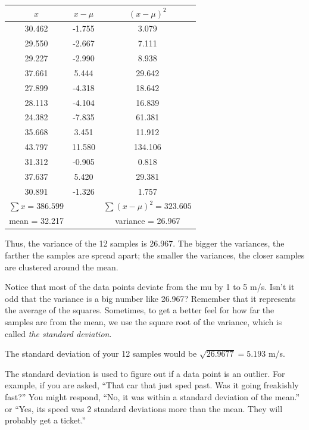 \begin{tabular} {c | c | c}

  $x$ & $x - \mu$ & $(x - \mu)^2$\\
  \hline
30.462 & -1.755 & 3.079 \\
29.550 & -2.667 & 7.111\\
29.227 & -2.990 & 8.938\\
37.661 & 5.444 & 29.642\\
27.899 & -4.318 & 18.642\\
28.113 & -4.104 & 16.839 \\
24.382 & -7.835 & 61.381 \\
35.668 & 3.451 & 11.912 \\
43.797 & 11.580 & 134.106\\
31.312 & -0.905 & 0.818\\
37.637 & 5.420 & 29.381\\
30.891 & -1.326 & 1.757\\
\hline
$\sum x = 386.599$ & & $\sum (x - \mu)^2 = 323.605$\\
mean = 32.217 & & variance = 26.967
\end{tabular}

Thus, the variance of the 12 samples is 26.967. The bigger the variances, 
the farther the samples are spread apart; the smaller the variances, the closer
samples are clustered around the mean.

Notice that most of the data points deviate from the mu by 1 to 5
m/s. Isn't it odd that the variance is a big number like 26.967?
Remember that it represents the average of the squares. Sometimes, to
get a better feel for how far the samples are from the mean, we use
the square root of the variance, which is called \textit{the standard
  deviation}.

The standard deviation of your 12 samples would be $\sqrt{26.9677} =
  5.193$ m/s.

The standard deviation is used to figure out if a data point is an
outlier. For example, if you are asked, ``That car that just sped
past. Was it going freakishly fast?'' You might respond, ``No, it was
within a standard deviation of the mean.'' or ``Yes, its speed was 2
standard deviations more than the mean. They will probably get a ticket.''

